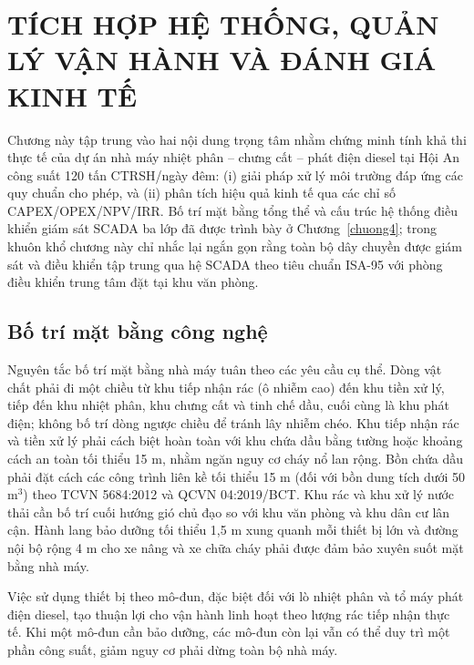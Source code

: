 \documentclass[../main.tex]{subfiles}
\begin{document}
\chapter{TÍCH HỢP HỆ THỐNG, QUẢN LÝ VẬN HÀNH VÀ ĐÁNH GIÁ KINH TẾ}
\label{chuong5}

Chương này tập trung vào hai nội dung trọng tâm nhằm chứng minh tính khả thi thực tế của dự án nhà máy nhiệt phân -- chưng cất -- phát điện diesel tại Hội An công suất 120 tấn CTRSH/ngày đêm: (i) giải pháp xử lý môi trường đáp ứng các quy chuẩn cho phép, và (ii) phân tích hiệu quả kinh tế qua các chỉ số CAPEX/OPEX/NPV/IRR. Bố trí mặt bằng tổng thể và cấu trúc hệ thống điều khiển giám sát SCADA ba lớp đã được trình bày ở Chương~\ref{chuong4}; trong khuôn khổ chương này chỉ nhắc lại ngắn gọn rằng toàn bộ dây chuyền được giám sát và điều khiển tập trung qua hệ SCADA theo tiêu chuẩn ISA-95 với phòng điều khiển trung tâm đặt tại khu văn phòng.

\section{Bố trí mặt bằng công nghệ}
\label{sec:bo-tri-mat-bang}

Nguyên tắc bố trí mặt bằng nhà máy tuân theo các yêu cầu cụ thể. Dòng vật chất phải đi một chiều từ khu tiếp nhận rác (ô nhiễm cao) đến khu tiền xử lý, tiếp đến khu nhiệt phân, khu chưng cất và tinh chế dầu, cuối cùng là khu phát điện; không bố trí dòng ngược chiều để tránh lây nhiễm chéo. Khu tiếp nhận rác và tiền xử lý phải cách biệt hoàn toàn với khu chứa dầu bằng tường hoặc khoảng cách an toàn tối thiểu 15 m, nhằm ngăn nguy cơ cháy nổ lan rộng. Bồn chứa dầu phải đặt cách các công trình liên kề tối thiểu 15 m (đối với bồn dung tích dưới 50 m$^3$) theo TCVN 5684:2012 và QCVN 04:2019/BCT. Khu rác và khu xử lý nước thải cần bố trí cuối hướng gió chủ đạo so với khu văn phòng và khu dân cư lân cận. Hành lang bảo dưỡng tối thiểu 1,5 m xung quanh mỗi thiết bị lớn và đường nội bộ rộng 4 m cho xe nâng và xe chữa cháy phải được đảm bảo xuyên suốt mặt bằng nhà máy.

Việc sử dụng thiết bị theo mô-đun, đặc biệt đối với lò nhiệt phân và tổ máy phát điện diesel, tạo thuận lợi cho vận hành linh hoạt theo lượng rác tiếp nhận thực tế. Khi một mô-đun cần bảo dưỡng, các mô-đun còn lại vẫn có thể duy trì một phần công suất, giảm nguy cơ phải dừng toàn bộ nhà máy.
\end{document}
